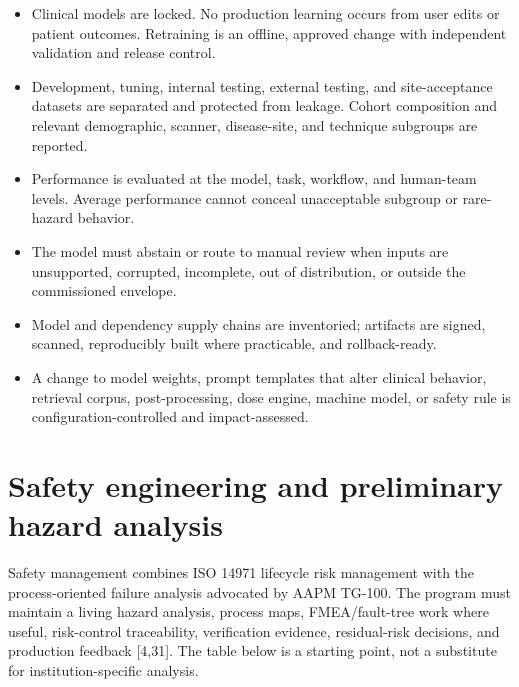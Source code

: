 \documentclass[11pt,letterpaper]{article}
\begin{document}
\begin{itemize}
\item Clinical models are locked. No production learning occurs from user edits or patient outcomes. Retraining is an offline, approved change with independent validation and release control.
\item Development, tuning, internal testing, external testing, and site-acceptance datasets are separated and protected from leakage. Cohort composition and relevant demographic, scanner, disease-site, and technique subgroups are reported.
\item Performance is evaluated at the model, task, workflow, and human-team levels. Average performance cannot conceal unacceptable subgroup or rare-hazard behavior.
\item The model must abstain or route to manual review when inputs are unsupported, corrupted, incomplete, out of distribution, or outside the commissioned envelope.
\item Model and dependency supply chains are inventoried; artifacts are signed, scanned, reproducibly built where practicable, and rollback-ready.
\item A change to model weights, prompt templates that alter clinical behavior, retrieval corpus, post-processing, dose engine, machine model, or safety rule is configuration-controlled and impact-assessed.
\end{itemize}

\section{Safety engineering and preliminary hazard analysis}

Safety management combines ISO 14971 lifecycle risk management with the process-oriented failure analysis advocated by AAPM TG-100. The program must maintain a living hazard analysis, process maps, FMEA\slash\allowbreak{}fault-tree work where useful, risk-control traceability, verification evidence, residual-risk decisions, and production feedback [4,31]. The table below is a starting point, not a substitute for institution-specific analysis.
\end{document}
